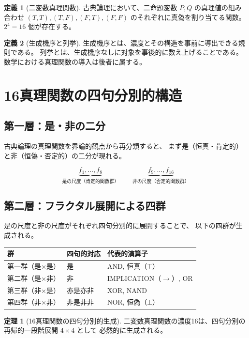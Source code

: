 \documentclass[11pt,a4paper]{article}
\theoremstyle{definition}
\newtheorem{definition}{定義}[section]
\newtheorem{theorem}{定理}[section]
\begin{document}
\begin{definition}[二変数真理関数]
古典論理において、二命題変数 $P, Q$ の真理値の組み合わせ
$(T,T),(T,F),(F,T),(F,F)$ のそれぞれに真偽を割り当てる関数。
$2^4 = 16$ 個が存在する。
\end{definition}

\begin{definition}[生成機序と列挙]
生成機序とは、濃度とその構造を事前に導出できる規則である。
列挙とは、生成機序なしに対象を事後的に数え上げることである。
数学における真理関数の導入は後者に属する。
\end{definition}

\section{16真理関数の四句分別的構造}

\subsection{第一層：是・非の二分}

古典論理の真理関数を界論的観点から再分類すると、
まず是（恒真・肯定的）と非（恒偽・否定的）の二分が現れる。

\[
\underbrace{f_1,\ldots,f_8}_{\text{是の尺度（肯定的関数群）}}
\qquad
\underbrace{f_9,\ldots,f_{16}}_{\text{非の尺度（否定的関数群）}}
\]

\subsection{第二層：フラクタル展開による四群}

是の尺度と非の尺度がそれぞれ四句分別的に展開することで、
以下の四群が生成される。

\begin{center}
\begin{tabular}{lll}
\toprule
群 & 四句的対応 & 代表的演算子 \\
\midrule
第一群（是×是） & 是 & AND, 恒真（$\top$） \\
第二群（是×非） & 非 & IMPLICATION（$\to$）, OR \\
第三群（非×是） & 亦是亦非 & XOR, NAND \\
第四群（非×非） & 非是非非 & NOR, 恒偽（$\bot$） \\
\bottomrule
\end{tabular}
\end{center}

\begin{theorem}[16真理関数の四句分別的生成]
二変数真理関数の濃度16は、四句分別の再帰的一段階展開 $4 \times 4$ として
必然的に生成される。
\end{theorem}
\end{document}
